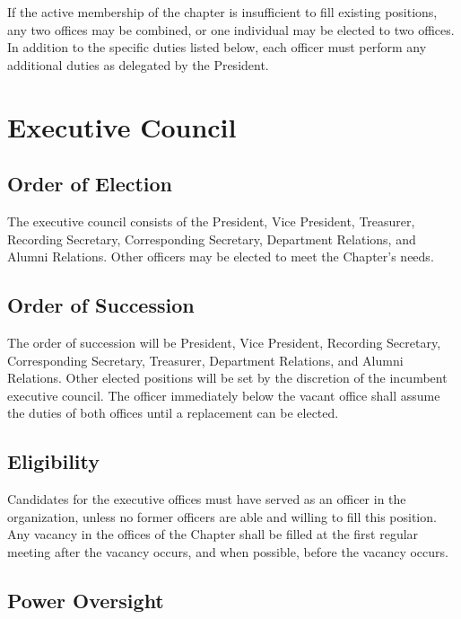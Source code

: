 \documentclass[11pt]{article}
\begin{document}
If the active membership of the chapter is insufficient to fill existing positions, any two offices may be combined, or one individual may be elected to two offices.
In addition to the specific duties listed below, each officer must perform any additional duties as delegated by the President.
\section{Executive Council}
\label{sec:org643dab1}

\subsection{Order of Election}
\label{sec:org8a529b1}

The executive council consists of the President, Vice President, Treasurer, Recording Secretary, Corresponding Secretary, Department Relations, and Alumni Relations. Other officers may be elected to meet the Chapter’s needs.

\subsection{Order of Succession}
\label{sec:org56d80f5}

The order of succession will be President, Vice President, Recording Secretary, Corresponding Secretary, Treasurer, Department Relations, and Alumni Relations.
Other elected positions will be set by the discretion of the incumbent executive council.
The officer immediately below the vacant office shall assume the duties of both offices until a replacement can be elected.

\subsection{Eligibility}
\label{sec:org988e41c}

Candidates for the executive offices must have served as an officer in the organization, unless no former officers are able and willing to fill this position.
Any vacancy in the offices of the Chapter shall be filled at the first regular meeting after the vacancy occurs, and when possible, before the vacancy occurs.

\subsection{Power Oversight}
\label{sec:org03210a4}
\end{document}

